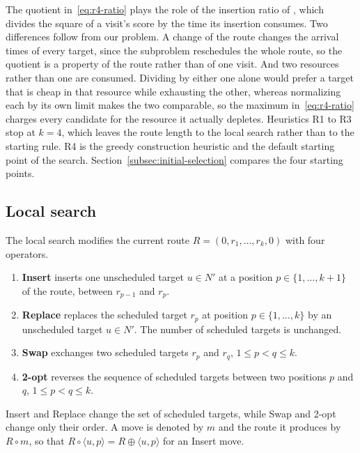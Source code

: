 The quotient in~\eqref{eq:r4-ratio} plays the role of the insertion ratio of \citep{vansteenwegen2009iterated}, which divides the square of a visit's score by the time its insertion consumes. Two differences follow from our problem. A change of the route changes the arrival times of every target, since the subproblem reschedules the whole route, so the quotient is a property of the route rather than of one visit. And two resources rather than one are consumed. Dividing by either one alone would prefer a target that is cheap in that resource while exhausting the other, whereas normalizing each by its own limit makes the two comparable, so the maximum in~\eqref{eq:r4-ratio} charges every candidate for the resource it actually depletes. Heuristics R1 to R3 stop at $k = 4$, which leaves the route length to the local search rather than to the starting rule. R4 is the greedy construction heuristic and the default starting point of the search. Section~\ref{subsec:initial-selection} compares the four starting points.

\subsection{Local search}\label{subsec:proposal}\label{subsec:operators}

The local search modifies the current route $R = (0, r_1, \ldots, r_k, 0)$ with four operators.
\begin{enumerate}[noitemsep, topsep=4pt, leftmargin=2em]
    \item \textbf{Insert} inserts one unscheduled target $u \in N'$ at a position $p \in \{1, \ldots, k+1\}$ of the route, between $r_{p-1}$ and $r_p$.
    \item \textbf{Replace} replaces the scheduled target $r_p$ at position $p \in \{1, \ldots, k\}$ by an unscheduled target $u \in N'$. The number of scheduled targets is unchanged.
    \item \textbf{Swap} exchanges two scheduled targets $r_p$ and $r_q$, $1 \le p < q \le k$.
    \item \textbf{2-opt} reverses the sequence of scheduled targets between two positions $p$ and $q$, $1 \le p < q \le k$.
\end{enumerate}
Insert and Replace change the set of scheduled targets, while Swap and 2-opt change only their order. A move is denoted by $m$ and the route it produces by $R \circ m$, so that $R \circ \langle u, p \rangle = R \oplus \langle u, p \rangle$ for an Insert move.

